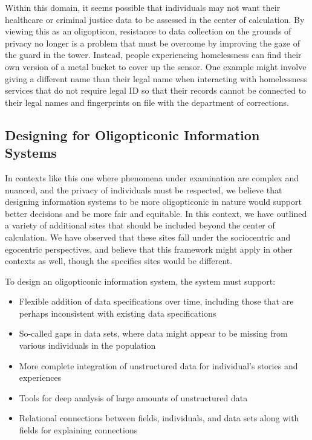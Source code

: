 Within this domain, it seems possible that individuals may not want their healthcare or criminal justice data to be assessed in the center of calculation. By viewing this as an oligopticon, resistance to data collection on the grounds of privacy no longer is a problem that must be overcome by improving the gaze of the guard in the tower. Instead, people experiencing homelessness can find their own version of a metal bucket to cover up the sensor. One example might involve giving a different name than their legal name when interacting with homelessness services that do not require legal ID so that their records cannot be connected to their legal names and fingerprints on file with the department of corrections.

\subsection{Designing for Oligopticonic Information Systems}
In contexts like this one where phenomena under examination are complex and nuanced, and the privacy of individuals must be respected, we believe that designing information systems to be more oligopticonic in nature would support better decisions and be more fair and equitable. In this context, we have outlined a variety of additional sites that should be included beyond the center of calculation. We have observed that these sites fall under the sociocentric and egocentric perspectives, and believe that this framework might apply in other contexts as well, though the specifics sites would be different.

To design an oligopticonic information system, the system must support:

\begin{itemize}
\item Flexible addition of data specifications over time, including those that are perhaps inconsistent with existing data specifications
\item So-called gaps in data sets, where data might appear to be missing from various individuals in the population
\item More complete integration of unstructured data for individual's stories and experiences
\item Tools for deep analysis of large amounts of unstructured data 
\item Relational connections between fields, individuals, and data sets along with fields for explaining connections
\end{itemize}

